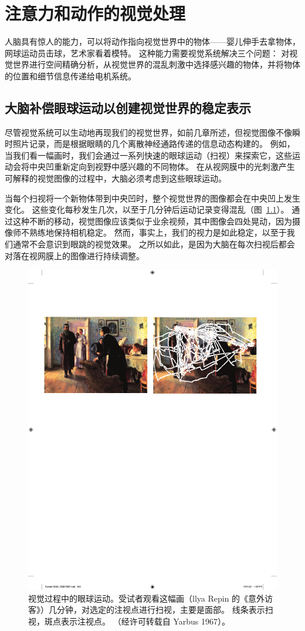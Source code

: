 \chapter{注意力和动作的视觉处理} \label{chap:chap25}

人脑具有惊人的能力，可以将动作指向视觉世界中的物体——婴儿伸手去拿物体，网球运动员击球，艺术家看着模特。
这种能力需要视觉系统解决三个问题：
对视觉世界进行空间精确分析，从视觉世界的混乱刺激中选择感兴趣的物体，并将物体的位置和细节信息传递给电机系统。



\section{大脑补偿眼球运动以创建视觉世界的稳定表示}

尽管视觉系统可以生动地再现我们的视觉世界，如前几章所述，但视觉图像不像瞬时照片记录，而是根据眼睛的几个离散神经通路传递的信息动态构建的。
例如，当我们看一幅画时，我们会通过一系列快速的眼球运动（扫视）来探索它，这些运动会将中央凹重新定向到视野中感兴趣的不同物体。
在从视网膜中的光刺激产生可解释的视觉图像的过程中，大脑必须考虑到这些眼球运动。


当每个扫视将一个新物体带到中央凹时，整个视觉世界的图像都会在中央凹上发生变化。
这些变化每秒发生几次，以至于几分钟后运动记录变得混乱（图~\ref{fig:25_1}）。
通过这种不断的移动，视觉图像应该类似于业余视频，其中图像会四处晃动，因为摄像师不熟练地保持相机稳定。 
然而，事实上，我们的视力是如此稳定，以至于我们通常不会意识到眼跳的视觉效果。
之所以如此，是因为大脑在每次扫视后都会对落在视网膜上的图像进行持续调整。


\begin{figure}[htbp]
	\centering
	\includegraphics[width=0.65\linewidth]{chap25/fig_25_1}
	\caption{视觉过程中的眼球运动。受试者观看这幅画（llya Repin 的《意外访客》）几分钟，对选定的注视点进行扫视，主要是面部。 线条表示扫视，斑点表示注视点。 （经许可转载自 Yarbus 1967）。}
	\label{fig:25_1}
\end{figure}


